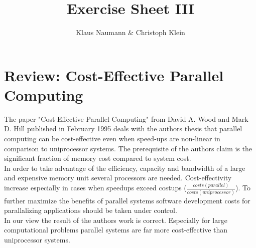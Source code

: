 \documentclass[oneside,a4paper]{scrartcl}
\begin{document}

\title{Exercise Sheet III}
\subject{Advanced Parallel Computing}
\author{Klaus Naumann \& Christoph Klein}
\maketitle




\section{Review: Cost-Effective Parallel Computing}
The paper "Cost-Effective Parallel Computing" from David A. Wood and 
Mark D. Hill published in February 1995 deals with the authors thesis
that parallel computing can be cost-effective even when speed-ups are
non-linear in comparison to uniprocessor systems. The prerequisite of 
the authors claim is the significant fraction of memory cost compared
to system cost.
\\
In order to take advantage of the efficiency, capacity and bandwidth 
of a large and expensive memory unit several processors are needed.
Cost-effectivity increase especially in cases when speedups exceed 
costups ($\frac{costs(parallel)}{costs(uniprocessor)}$). To further
maximize the benefits of parallel systems software development costs
for parallalizing applications should be taken under control.
\\
In our view the result of the authors work is correct. Especially for
large computational problems parallel systems are far more cost-effective
than uniprocessor systems.
\end{document}
